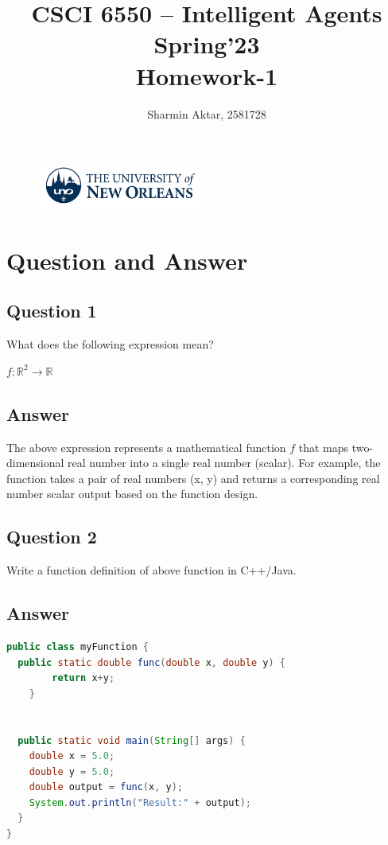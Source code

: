 \documentclass[12]{article}
\title{\textbf{CSCI 6550 – Intelligent Agents\\Spring'23}\\\textbf{Homework-1}}
\author{Sharmin Aktar, 2581728}
\begin{document}
\begin{figure}
\centering
\includegraphics[width=0.5\textwidth]{images/uno_logo.png}
\end{figure}

\maketitle

\section*{Question and Answer}

\subsection*{Question 1}
What does the following expression mean?
\begin{center}
    $f: \mathbb{R}^2 \rightarrow \mathbb{R}$
\end{center}

\subsection*{Answer}
The above expression represents a mathematical function $f$ that maps two-dimensional real number into a single real number (scalar). For example, the function takes a pair of real numbers (x, y) and returns a corresponding real number scalar output based on the function design.

\subsection*{Question 2}
Write a function definition of above function in C++/Java.
\subsection*{Answer}

\begin{lstlisting}[language=Java]
public class myFunction {
  public static double func(double x, double y) {
        return x+y;
    }
  
  
  public static void main(String[] args) { 
    double x = 5.0;
    double y = 5.0;
    double output = func(x, y);
    System.out.println("Result:" + output);
  }
}
\end{lstlisting}
\end{document}
